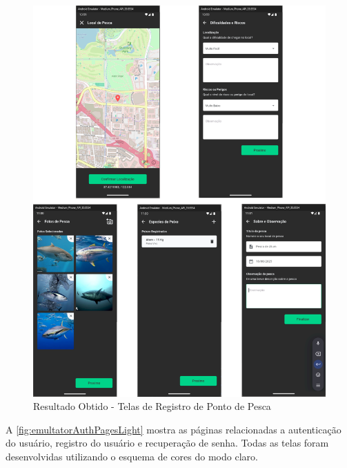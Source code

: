 \begin{figure}[H]
    \centering
    \caption{Resultado Obtido - Telas de Registro de Ponto de Pesca}
    \label{fig:emultatorSpotRegisterPages}
    \includegraphics[scale=0.35]{./dados/figuras/emulator-spot-register-pages.png}
\end{figure}


A \autoref{fig:emultatorAuthPagesLight} mostra as páginas relacionadas a autenticação do usuário, registro do usuário e recuperação de senha. Todas as telas foram desenvolvidas utilizando o esquema de cores do modo claro.

